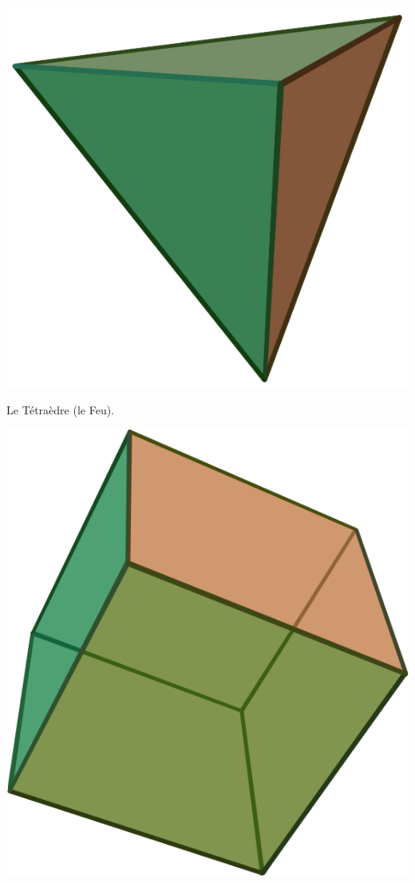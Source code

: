{
\centering
\includegraphics[width=0.25\marginparwidth]{SM/Tetrahedron.png}
\captionsetup{type=subfigure}\caption{Le Tétraèdre (le Feu).}
\includegraphics[width=0.25\marginparwidth]{SM/Hexahedron.png}
}
